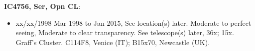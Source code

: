 {\bf IC4756, Ser, Opn CL}:
\begin{itemize}
\item xx/xx/1998 Mar 1998 to Jan 2015, See location(s) later. Moderate to perfect seeing, Moderate to clear transparency. See telescope(s) later, 36x; 15x. Graff's Cluster. C114F8, Venice (IT); B15x70, Newcastle (UK).
\end{itemize}
